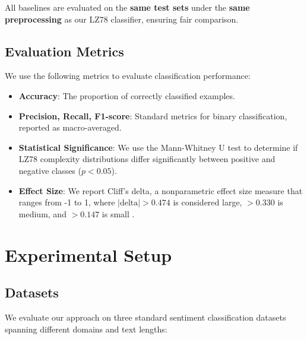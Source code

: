 \documentclass[11pt,letterpaper]{article}
\begin{document}
All baselines are evaluated on the \textbf{same test sets} under the \textbf{same preprocessing} as our LZ78 classifier, ensuring fair comparison.

\subsection{Evaluation Metrics}

We use the following metrics to evaluate classification performance:

\begin{itemize}
  \item \textbf{Accuracy}: The proportion of correctly classified examples.
  \item \textbf{Precision, Recall, F1-score}: Standard metrics for binary classification, reported as macro-averaged.
  \item \textbf{Statistical Significance}: We use the Mann-Whitney U test to determine if LZ78 complexity distributions differ significantly between positive and negative classes ($p < 0.05$).
  \item \textbf{Effect Size}: We report Cliff's delta, a nonparametric effect size measure that ranges from -1 to 1, where $|\text{delta}| > 0.474$ is considered large, $> 0.330$ is medium, and $> 0.147$ is small \cite{Cliff1993}.
\end{itemize}

\section{Experimental Setup}

\subsection{Datasets}

We evaluate our approach on three standard sentiment classification datasets spanning different domains and text lengths:
\end{document}
